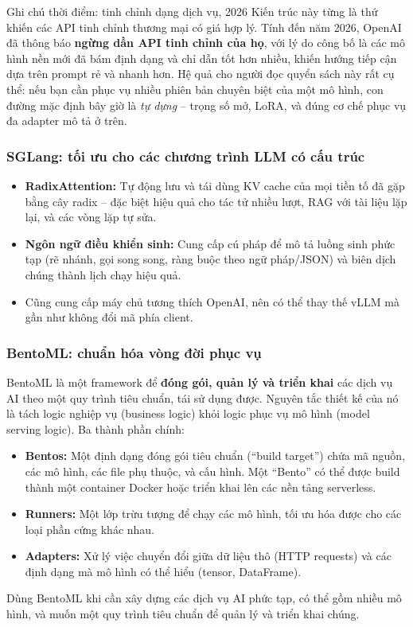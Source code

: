 \begin{keyidea}{Ghi chú thời điểm: tinh chỉnh dạng dịch vụ, 2026}
Kiến trúc này từng là thứ khiến các API tinh chỉnh thương mại có giá hợp lý. Tính đến năm 2026, OpenAI đã thông báo \textbf{ngừng dần API tinh chỉnh của họ}, với lý do công bố là các mô hình nền mới đã bám định dạng và chỉ dẫn tốt hơn nhiều, khiến hướng tiếp cận dựa trên prompt rẻ và nhanh hơn. Hệ quả cho người đọc quyển sách này rất cụ thể: nếu bạn cần phục vụ nhiều phiên bản chuyên biệt của một mô hình, con đường mặc định bây giờ là \emph{tự dựng} -- trọng số mở, LoRA, và đúng cơ chế phục vụ đa adapter mô tả ở trên.
\end{keyidea}

\subsubsection{SGLang: tối ưu cho các chương trình LLM có cấu trúc}
\begin{itemize}
	\item \textbf{RadixAttention:} Tự động lưu và tái dùng KV cache của mọi tiền tố đã gặp bằng cây radix \cite{zheng2024sglang} -- đặc biệt hiệu quả cho tác tử nhiều lượt, RAG với tài liệu lặp lại, và các vòng lặp tự sửa.
	\item \textbf{Ngôn ngữ điều khiển sinh:} Cung cấp cú pháp để mô tả luồng sinh phức tạp (rẽ nhánh, gọi song song, ràng buộc theo ngữ pháp/JSON) và biên dịch chúng thành lịch chạy hiệu quả.
	\item Cũng cung cấp máy chủ tương thích OpenAI, nên có thể thay thế vLLM mà gần như không đổi mã phía client.
\end{itemize}

\subsubsection{BentoML: chuẩn hóa vòng đời phục vụ}
BentoML là một framework để \textbf{đóng gói, quản lý và triển khai} các dịch vụ AI theo một quy trình tiêu chuẩn, tái sử dụng được. Nguyên tắc thiết kế của nó là tách logic nghiệp vụ (business logic) khỏi logic phục vụ mô hình (model serving logic). Ba thành phần chính:
\begin{itemize}
    \item \textbf{Bentos:} Một định dạng đóng gói tiêu chuẩn (“build target”) chứa mã nguồn, các mô hình, các file phụ thuộc, và cấu hình. Một “Bento” có thể được build thành một container Docker hoặc triển khai lên các nền tảng serverless.
    \item \textbf{Runners:} Một lớp trừu tượng để chạy các mô hình, tối ưu hóa được cho các loại phần cứng khác nhau.
    \item \textbf{Adapters:} Xử lý việc chuyển đổi giữa dữ liệu thô (HTTP requests) và các định dạng mà mô hình có thể hiểu (tensor, DataFrame).
\end{itemize}
Dùng BentoML khi cần xây dựng các dịch vụ AI phức tạp, có thể gồm nhiều mô hình, và muốn một quy trình tiêu chuẩn để quản lý và triển khai chúng.

